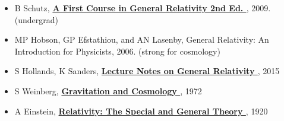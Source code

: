 \begin{itemize}[]
	\item[
		\href{run:C:/Users/verci/Documents/Reference Books/Physics/A First Course in General Relativity Second Edition [Schutz].pdf
		}{$\blacksquare$}
	]
	B Schutz,
	\textbf{\href{https://article.sk/book/KN26VnNp20/a-first-course-in-general-relativity-second-edition.html
	}{
		A First Course in General Relativity 2nd Ed.%
	}}, 2009. (undergrad)

	\item[
		$\blacksquare$
	]
	MP Hobson, GP Efstathiou, and AN Lasenby,
	General Relativity: An Introduction for Physicists,
	2006. (strong for cosmology)

	\item[
		\href{run:C:/Users/verci/Documents/Reference Books/Physics/Lecture Notes on General Relativity [Hollands, Sanders].pdf
		}{$\blacksquare$}
	]
	S Hollands, K Sanders,
	\textbf{\href{https://www.freebookcentre.net/physics-books-download/Lecture-Notes-on-General-Relativity-by-S.-Hollands-and-Ko-Sanders.html
	}{
		Lecture Notes on General Relativity%
	}}, 2015

	\item[
		\href{run:C:/Users/verci/Documents/Reference Books/Physics/Gravitation and Cosmology [Weinberg].pdf
		}{$\blacksquare$}
	]
	S Weinberg,
	\textbf{
		\href{https://article.sk/book/1ojNn5RzjP/gravitation-and-cosmology-principles-and-applications-of-the-general-theory-of-relativity.html
	}{
		Gravitation and Cosmology%
	}}, 1972

	\item[
		\href{run:C:/Users/verci/Documents/Reference Books/Physics/Relativity - The Special and General Theory [Einstein].pdf
		}{$\blacksquare$}
	]
	A Einstein,
	\textbf{
		\href{https://www.gutenberg.org/files/36114/36114-pdf.pdf
	}{
		Relativity: The Special and General Theory%
	}}, 1920
\end{itemize}



